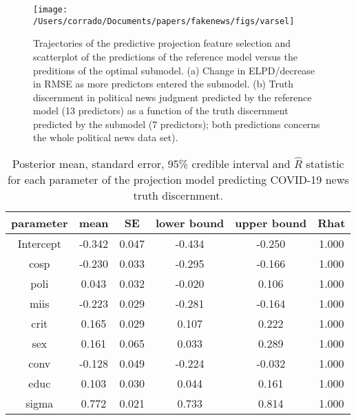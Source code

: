 \documentclass[
  english,
  man,floatsintext]{apa6}
\begin{document}
\begin{figure}

{\centering \texttt{[image: /Users/corrado/Documents/papers/fakenews/figs/varsel]} 

}

\caption{Trajectories of the predictive projection feature selection and scatterplot of the predictions of the reference model versus the preditions of the optimal submodel. (a) Change in ELPD/decrease in RMSE as more predictors entered the submodel. (b) Truth discernment in political news judgment predicted by the reference model (13 predictors) as a function of the truth discernment predicted by the submodel (7 predictors); both predictions concerns the whole political news data set).}\label{fig:figr2subprojpol}
\end{figure}

\begin{table}[H]

\begin{center}
\begin{threeparttable}

\caption{\label{tab:tablesubcovid}Posterior mean, standard error, 95\% credible interval and $\hat{R}$
    statistic for each parameter of the projection model predicting COVID-19 news truth discernment.}

\small{

\begin{tabular}{cccccc}
\toprule
parameter & \multicolumn{1}{c}{mean} & \multicolumn{1}{c}{SE} & \multicolumn{1}{c}{lower bound} & \multicolumn{1}{c}{upper bound} & \multicolumn{1}{c}{Rhat}\\
\midrule
Intercept & -0.342 & 0.047 & -0.434 & -0.250 & 1.000\\
cosp & -0.230 & 0.033 & -0.295 & -0.166 & 1.000\\
poli & 0.043 & 0.032 & -0.020 & 0.106 & 1.000\\
miis & -0.223 & 0.029 & -0.281 & -0.164 & 1.000\\
crit & 0.165 & 0.029 & 0.107 & 0.222 & 1.000\\
sex & 0.161 & 0.065 & 0.033 & 0.289 & 1.000\\
conv & -0.128 & 0.049 & -0.224 & -0.032 & 1.000\\
educ & 0.103 & 0.030 & 0.044 & 0.161 & 1.000\\
sigma & 0.772 & 0.021 & 0.733 & 0.814 & 1.000\\
\bottomrule
\end{tabular}

}

\end{threeparttable}
\end{center}

\end{table}
\end{document}
